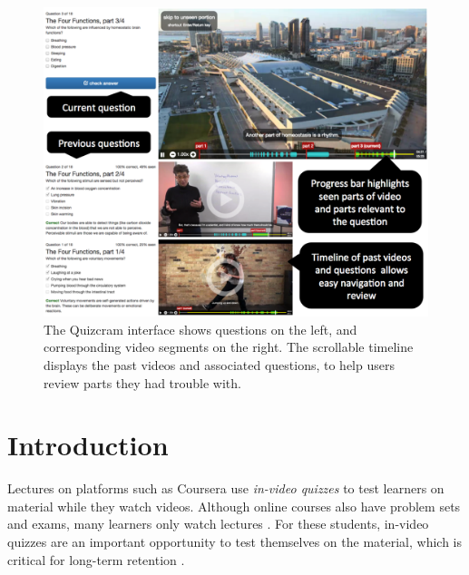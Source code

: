 \documentclass{sigchi}
\begin{document}

\begin{figure}
\centering
\includegraphics[width=1.0\columnwidth]{timeline-with-annotations}
\caption{The Quizcram interface shows questions on the left, and corresponding video segments on the right. The scrollable timeline displays the past videos and associated questions, to help users review parts they had trouble with.}
\label{fig:timeline}
\end{figure}

\section{Introduction}
Lectures on platforms such as Coursera use \emph{in-video quizzes} to test learners on material while they watch videos. Although online courses also have problem sets and exams, many learners only watch lectures \cite{anderson2014engaging} \cite{deconstructing}. For these students, in-video quizzes are an important opportunity to test themselves on the material, which is critical for long-term retention \cite{testingeffect}.
\end{document}
